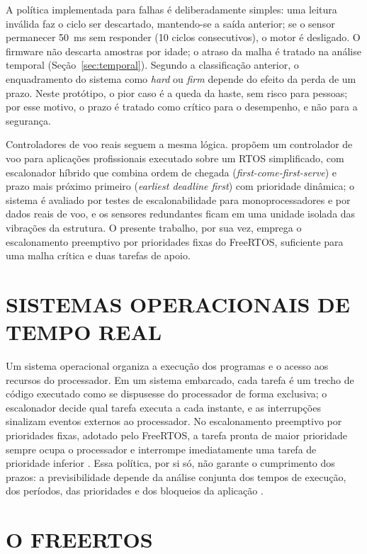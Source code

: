 A política implementada para falhas é deliberadamente simples: uma leitura inválida faz o ciclo ser descartado, mantendo-se a saída anterior; se o sensor permanecer 50~ms sem responder (10 ciclos consecutivos), o motor é desligado. O firmware não descarta amostras por idade; o atraso da malha é tratado na análise temporal (Seção~\ref{sec:temporal}). Segundo a classificação anterior, o enquadramento do sistema como \textit{hard} ou \textit{firm} depende do efeito da perda de um prazo. Neste protótipo, o pior caso é a queda da haste, sem risco para pessoas; por esse motivo, o prazo é tratado como crítico para o desempenho, e não para a segurança.

Controladores de voo reais seguem a mesma lógica.  propõem um controlador de voo para aplicações profissionais executado sobre um RTOS simplificado, com escalonador híbrido que combina ordem de chegada (\textit{first-come-first-serve}) e prazo mais próximo primeiro (\textit{earliest deadline first}) com prioridade dinâmica; o sistema é avaliado por testes de escalonabilidade para monoprocessadores e por dados reais de voo, e os sensores redundantes ficam em uma unidade isolada das vibrações da estrutura. O presente trabalho, por sua vez, emprega o escalonamento preemptivo por prioridades fixas do FreeRTOS, suficiente para uma malha crítica e duas tarefas de apoio.

\section{SISTEMAS OPERACIONAIS DE TEMPO REAL}

Um sistema operacional organiza a execução dos programas e o acesso aos recursos do processador. Em um sistema embarcado, cada tarefa é um trecho de código executado como se dispusesse do processador de forma exclusiva; o escalonador decide qual tarefa executa a cada instante, e as interrupções sinalizam eventos externos ao processador. No escalonamento preemptivo por prioridades fixas, adotado pelo FreeRTOS, a tarefa pronta de maior prioridade sempre ocupa o processador e interrompe imediatamente uma tarefa de prioridade inferior \cite{barry2016}. Essa política, por si só, não garante o cumprimento dos prazos: a previsibilidade depende da análise conjunta dos tempos de execução, dos períodos, das prioridades e dos bloqueios da aplicação \cite[p.~369--375]{burns2009}.

\section{O FREERTOS}

